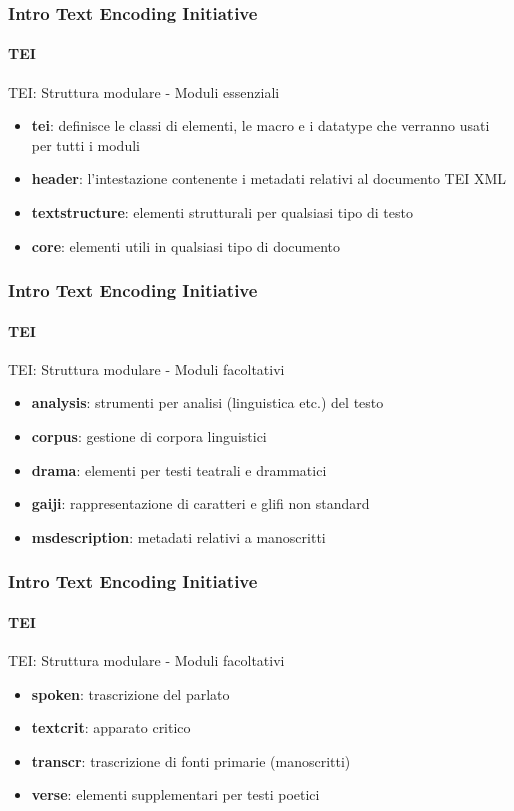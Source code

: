 \begin{frame}
	\frametitle{Intro Text Encoding Initiative}
	\framesubtitle{TEI}
	\addtocounter{nframe}{1}

	\begin{block}{TEI: Struttura modulare - Moduli essenziali}
		\begin{itemize}
			\item \textbf{tei}: definisce le classi di elementi, le macro e i datatype che verranno usati per tutti i moduli
			\item \textbf{header}: l’intestazione contenente i metadati relativi al documento TEI XML
			\item \textbf{textstructure}: elementi strutturali per qualsiasi tipo di testo
			\item \textbf{core}: elementi utili in qualsiasi tipo di documento
		\end{itemize}

	\end{block}

\end{frame}

\begin{frame}
	\frametitle{Intro Text Encoding Initiative}
	\framesubtitle{TEI}
	\addtocounter{nframe}{1}

	\begin{block}{TEI: Struttura modulare - Moduli facoltativi}
		\begin{itemize}
			\item \textbf{analysis}: strumenti per analisi (linguistica etc.) del testo
			\item \textbf{corpus}: gestione di corpora linguistici
			\item \textbf{drama}: elementi per testi teatrali e drammatici
			\item \textbf{gaiji}: rappresentazione di caratteri e glifi non standard
			\item \textbf{msdescription}: metadati relativi a manoscritti
		\end{itemize}

	\end{block}

\end{frame}


\begin{frame}
	\frametitle{Intro Text Encoding Initiative}
	\framesubtitle{TEI}
	\addtocounter{nframe}{1}

	\begin{block}{TEI: Struttura modulare - Moduli facoltativi}
		\begin{itemize}
			\item \textbf{spoken}: trascrizione del parlato
			\item \textbf{textcrit}: apparato critico
			\item \textbf{transcr}:  trascrizione di fonti primarie (manoscritti)
			\item \textbf{verse}: elementi supplementari per testi poetici
		\end{itemize}

	\end{block}

\end{frame}

